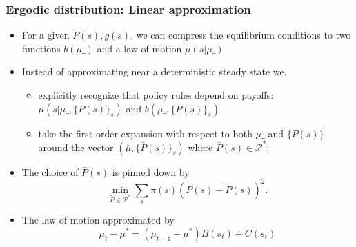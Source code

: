 \documentclass{beamer}
\begin{document}
\begin{frame}\label{linear appendix}
\frametitle{Ergodic distribution: Linear approximation}
\begin{itemize}
\item For a given $P(s),g(s)$, we can compress the equilibrium conditions to two functions $b(\mu\_)$ and a law of motion $\mu(s|\mu\_)$
\item Instead of approximating near a deterministic steady state we,

\begin{itemize}
\item explicitly recognize that policy rules depend on payoffs: $\mu(s|\mu\_,\{P(s)\}_s)$ and $b(\mu\_,\{P(s)\}_s)$
\item take the first order expansion with respect to both $\mu\_$ and $\{P(s)\}$ 
around the vector $(\bar{\mu},\{\bar{P}(s)\}_s)$ where $\bar{P}(s) \in \mathcal{P}^*$: 
\end{itemize}

\item The choice of $\bar P(s)$ is pinned down by 
\[
\min_{\tilde{P}\in \mathcal{P}^*} \sum_{s}\pi(s)( P(s)-\tilde{P}(s))^2.
\]
\item The law of motion approximated by
\[\mu_t-\mu^*=(\mu_{t-1}-\mu^*) B(s_t)+C(s_t)\]
\end{itemize}
\hyperlink{linearization}{}

\end{frame}
\end{document}

